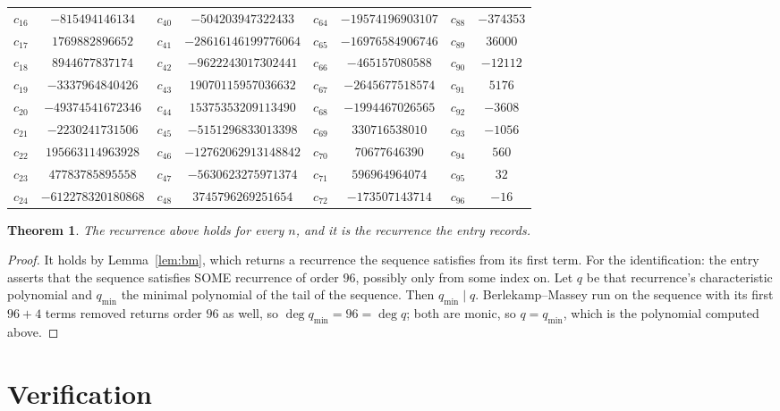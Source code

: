 \documentclass[11pt,a4paper]{article}
\theoremstyle{plain}
\newtheorem{theorem}{Theorem}
\theoremstyle{definition}
\begin{document}
\begin{center}
\begin{tabular}{cccccccc}
$c_{16}$ & $-815494146134$ & $c_{40}$ & $-504203947322433$ & $c_{64}$ & $-19574196903107$ & $c_{88}$ & $-374353$ \\
$c_{17}$ & $1769882896652$ & $c_{41}$ & $-28616146199776064$ & $c_{65}$ & $-16976584906746$ & $c_{89}$ & $36000$ \\
$c_{18}$ & $8944677837174$ & $c_{42}$ & $-9622243017302441$ & $c_{66}$ & $-465157080588$ & $c_{90}$ & $-12112$ \\
$c_{19}$ & $-3337964840426$ & $c_{43}$ & $19070115957036632$ & $c_{67}$ & $-2645677518574$ & $c_{91}$ & $5176$ \\
$c_{20}$ & $-49374541672346$ & $c_{44}$ & $15375353209113490$ & $c_{68}$ & $-1994467026565$ & $c_{92}$ & $-3608$ \\
$c_{21}$ & $-2230241731506$ & $c_{45}$ & $-5151296833013398$ & $c_{69}$ & $330716538010$ & $c_{93}$ & $-1056$ \\
$c_{22}$ & $195663114963928$ & $c_{46}$ & $-12762062913148842$ & $c_{70}$ & $70677646390$ & $c_{94}$ & $560$ \\
$c_{23}$ & $47783785895558$ & $c_{47}$ & $-5630623275971374$ & $c_{71}$ & $596964964074$ & $c_{95}$ & $32$ \\
$c_{24}$ & $-612278320180868$ & $c_{48}$ & $3745796269251654$ & $c_{72}$ & $-173507143714$ & $c_{96}$ & $-16$ \\
\end{tabular}
\end{center}

\begin{theorem}
The recurrence above holds for every $n$, and it is the recurrence the entry records.
\end{theorem}

\begin{proof}
It holds by Lemma~\ref{lem:bm}, which returns a recurrence the sequence satisfies from its
first term. For the identification: the entry asserts that the sequence satisfies SOME
recurrence of order $96$, possibly only from some index on. Let $q$ be that recurrence's
characteristic polynomial and $q_{\min}$ the minimal polynomial of the tail of the sequence.
Then $q_{\min}\mid q$. Berlekamp--Massey run on the sequence with its first $96+4$ terms
removed returns order $96$ as well, so $\deg q_{\min}=96=\deg q$; both are monic, so
$q=q_{\min}$, which is the polynomial computed above.
\end{proof}

\section{Verification}
\end{document}

